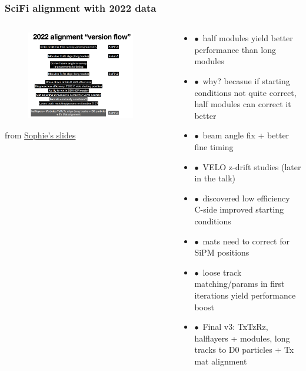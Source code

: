 \documentclass[aspectratio=1610, 12pt, xcolor=dvipsnames]{beamer}
\begin{document}
\begin{frame}\frametitle{SciFi alignment with 2022 data}
  \begin{columns}
    \begin{column}[c]{0.48\textwidth}
      \begin{figure}
        \includegraphics[width=0.9\textwidth]{plots/alignment_version_flow.png}
      \end{figure}
      from \href{https://indico.cern.ch/event/1275405/contributions/5372370/attachments/2636783/4562038/SciFiAlignUpdate_20230427.pdf}{Sophie's slides}
    \end{column}
    \begin{column}[c]{0.48\textwidth}
      \begin{itemize}
        \item $\bullet$\, half modules yield better performance than long modules
        \item $\bullet$\, why? becasue if starting conditions not quite correct, half modules can correct it better
        \item $\bullet$\, beam angle fix + better fine timing
        \item $\bullet$\, VELO z-drift studies (later in the talk)
        \item $\bullet$\, discovered low efficiency C-side \to improved starting conditions
        \item $\bullet$\, mats need to correct for SiPM positions
        \item $\bullet$\, loose track matching/params in first iterations yield performance boost
        \item $\bullet$\, Final v3: TxTzRz, halflayers + modules, long tracks to D0 particles + Tx mat alignment
      \end{itemize}
    \end{column}
  \end{columns}
\end{frame}
\end{document}
